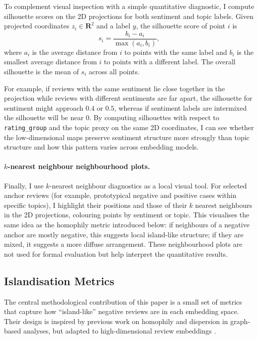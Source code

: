 \documentclass[a4paper,11pt]{article}
\begin{document}
To complement visual inspection with a simple quantitative diagnostic, I compute silhouette scores on the 2D projections for both sentiment and topic labels. 
Given projected coordinates $z_i \in \mathbf{R}^2$ and a label $y$, the silhouette score of point $i$ is
\[
s_i = \frac{b_i - a_i}{\max(a_i, b_i)},
\]
where $a_i$ is the average distance from $i$ to points with the same label and $b_i$ is the smallest average distance from $i$ to points with a different label. 
The overall silhouette is the mean of $s_i$ across all points.

For example, if reviews with the same sentiment lie close together in the projection while reviews with different sentiments are far apart, the silhouette for sentiment might approach $0.4$ or $0.5$, whereas if sentiment labels are intermixed the silhouette will be near $0$. 
By computing silhouettes with respect to \texttt{rating\_group} and the topic proxy on the same 2D coordinates, I can see whether the low-dimensional maps preserve sentiment structure more strongly than topic structure and how this pattern varies across embedding models.

\paragraph{$k$-nearest neighbour neighbourhood plots.}

Finally, I use $k$-nearest neighbour diagnostics as a local visual tool. 
For selected anchor reviews (for example, prototypical negative and positive cases within specific topics), I highlight their positions and those of their $k$ nearest neighbours in the 2D projections, colouring points by sentiment or topic. 
This visualises the same idea as the homophily metric introduced below: if neighbours of a negative anchor are mostly negative, this suggests local island-like structure; if they are mixed, it suggests a more diffuse arrangement. 
These neighbourhood plots are not used for formal evaluation but help interpret the quantitative results.

\subsection{Islandisation Metrics}
\label{subsec:island-metrics}

The central methodological contribution of this paper is a small set of metrics that capture how ``island-like'' negative reviews are in each embedding space. 
Their design is inspired by previous work on homophily and dispersion in graph-based analyses, but adapted to high-dimensional review embeddings \citep{newman-mixing}.
\end{document}
